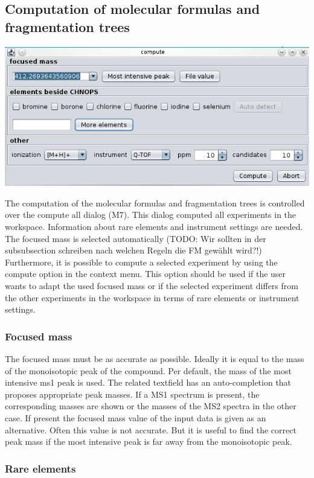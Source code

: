 \documentclass[a4paper,11pt]{article}
\begin{document}
 \subsection{Computation of molecular formulas and fragmentation trees}
 \label{sec:compute-all}
 
 \includegraphics[width=0.9\linewidth]{pics/compute_dialog.png} 
 
 The computation of the molecular formulas and fragmentation trees is controlled over the compute all dialog (M7).
 This dialog computed all experiments in the workspace. Information about rare elements and instrument settings are needed.
 The focused mass is selected automatically (TODO: Wir sollten in der subsubsection schreiben nach welchen Regeln die FM gewählt wird?!)
 Furthermore, it is possible to compute a selected experiment by using the compute option in the context menu.
 This option should be used if the user wants to adapt the used focused mass or if the selected experiment differs from the other experiments in
 the workspace in terms of rare elements or instrument settings.
 
 \subsubsection{Focused mass}
 
 The focused mass must be as accurate as possible. Ideally it is equal to the mass of the monoisotopic peak of the compound. Per default, 
 the mass of the most intensive ms1 peak is used. The related textfield has an auto-completion that proposes appropriate peak masses. 
 If a MS1 spectrum is present, the corresponding masses are shown or the masses of the MS2 spectra in the other case.  
 If present the focused mass value of the input data is given as an alternative.  Often this value is not accurate. 
 But it is useful to find the correct peak mass if the most intensive peak is far away from the monoisotopic peak.
 
 \subsubsection{Rare elements}
 
\end{document}
